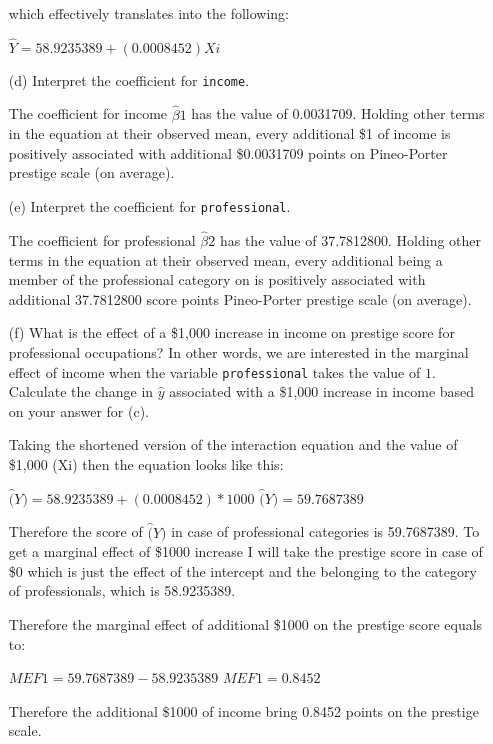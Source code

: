 \documentclass[12pt,letterpaper]{article}
\begin{document}
\begin{enumerate}
	which effectively translates into the following: 
	
	$\hat{Y} = 58.9235389 + (0.0008452)Xi$ 
	
\newpage
	\item [(d)]
	Interpret the coefficient for \texttt{income}.
	
	The coefficient for income $\hat{\beta}1$ has the value of 0.0031709. Holding other terms in the equation at their observed mean, every additional \$1 of income is positively associated with additional \$0.0031709 points on Pineo-Porter prestige scale (on average).     
	
	\vspace{1cm}	
	\item [(e)]
	Interpret the coefficient for \texttt{professional}.
	
	The coefficient for professional $\hat{\beta}2$ has the value of 37.7812800. Holding other terms in the equation at their observed mean, every additional being a member of the professional category on is positively associated with additional 37.7812800 score points Pineo-Porter prestige scale (on average). 
	
	\vspace{1cm}
	\item [(f)]
	What is the effect of a \$1,000 increase in income on prestige score for professional occupations? In other words, we are interested in the marginal effect of income when the variable \texttt{professional} takes the value of $1$. Calculate the change in $\hat{y}$ associated with a \$1,000 increase in income based on your answer for (c).
	
	Taking the shortened version of the interaction equation and the value of \$1,000 (Xi) then the equation looks like this: 
	
	$\hat(Y) = 58.9235389 + (0.0008452)*1000$
	$\hat(Y) = 59.7687389$
	
	Therefore the score of $\hat(Y)$ in case of professional categories is 59.7687389. To get a marginal effect of \$1000 increase I will take the prestige score in case of \$0 which is just the effect of the intercept and the belonging to the category of professionals, which is 58.9235389.  
	
	Therefore the marginal effect of additional \$1000 on the prestige score equals to: 
	
	$MEF1 = 59.7687389 - 58.9235389$
	$MEF1 = 0.8452$
	
	Therefore the additional \$1000 of income bring 0.8452 points on the prestige scale. 
	

\end{enumerate}
\end{document}
